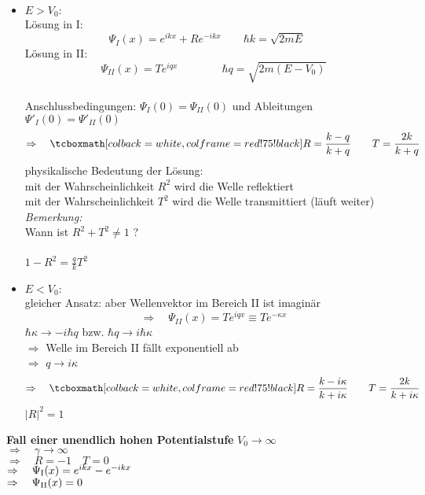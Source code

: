 \begin{itemize}
	\item $ E > V_0 : $\\
	Lösung in I:
	\begin{equation*}
	\Psi_{I}(x) = e^{i k x} + R e^{- i k x} \qquad \hbar k = \sqrt{2 m E} \quad \
	\end{equation*}
	Lösung in II:
	\begin{equation*}
	\Psi_{II}(x) = T e^{i q x} \qquad \qquad \hbar q = \sqrt{2 m (E - V_0)}
	\end{equation*}
	\\
	Anschlussbedingungen: $ \Psi_{I}(0) = \Psi_{II}(0) $ und Ableitungen $ \Psi'_{I}(0) = \Psi'_{II}(0) $
	\begin{equation*}
	\Rightarrow \quad \rmbox{ R = \frac{k - q}{k + q} \qquad T = \frac{2 k}{k + q} }
	\end{equation*}
	physikalische Bedeutung der Lösung:\\
	mit der Wahrscheinlichkeit $ R^2 $ wird die Welle reflektiert \\
	mit der Wahrscheinlichkeit $ T^2 $ wird die Welle transmittiert (läuft weiter)\\[5pt]
	\emph{Bemerkung:}\\
	Wann ist $ R^2 + T^2 \neq 1 $ ?\\
	\\
	$ 1 - R^2 = \frac{q}{k} T^2 $
	\item $ E < V_0 : $\\
	gleicher Ansatz: aber Wellenvektor im Bereich II ist imaginär
	\begin{equation*}
	\Rightarrow \quad \Psi_{II}(x) = T e^{i q x} \equiv T e^{- \kappa x}
	\end{equation*}
	$ \hbar \kappa \rightarrow - i \hbar q $ bzw. $ \hbar q \rightarrow i \hbar \kappa $\\
	$ \Rightarrow $ Welle im Bereich II fällt exponentiell ab\\
	$ \Rightarrow $ $ q \to i \kappa $
	\begin{equation*}
	\Rightarrow \quad \rmbox{ R = \frac{k - i \kappa}{k + i \kappa} \qquad T = \frac{2 k}{k + i \kappa} }
	\end{equation*}
	$ |R|^2 = 1 $\\
\end{itemize}
\textbf{Fall einer unendlich hohen Potentialstufe} $ V_0 \to \infty $\\
$ \Rightarrow \quad \gamma \to \infty $\\
$ \Rightarrow \quad R = - 1 \quad T = 0$\\
$ \Rightarrow \quad \Psi_{\textrm{I}}(x) = e^{i k x} - e^{- i k x} $\\
$ \Rightarrow \quad \Psi_{\textrm{II}}(x) = 0 $

